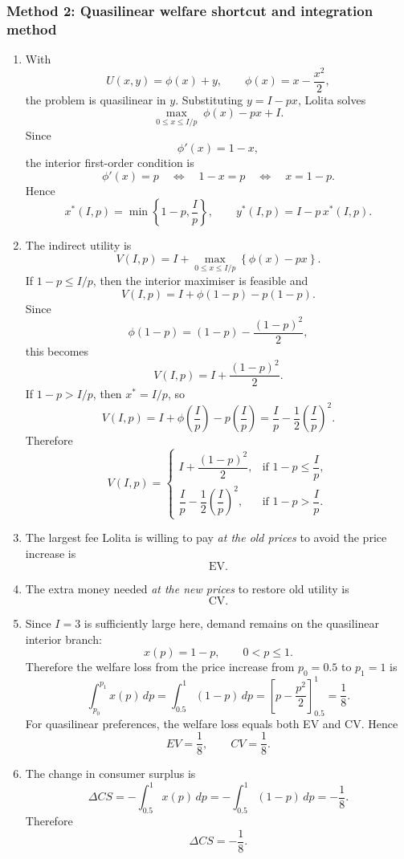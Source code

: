 \documentclass[12pt]{article}
\begin{document}
\newpage
\subsubsection{Method 2: Quasilinear welfare shortcut and integration method}
\begin{enumerate}[label=(\alph*)]
    \item
    With
    \[
    U(x,y)=\phi(x)+y,
    \qquad
    \phi(x)=x-\frac{x^2}{2},
    \]
    the problem is quasilinear in \(y\). Substituting \(y=I-px\), Lolita solves
    \[
    \max_{0\le x\le I/p}\;\phi(x)-px+I.
    \]
    Since
    \[
    \phi'(x)=1-x,
    \]
    the interior first-order condition is
    \[
    \phi'(x)=p
    \quad\Longleftrightarrow\quad
    1-x=p
    \quad\Longleftrightarrow\quad
    x=1-p.
    \]
    Hence
    \[
    \boxed{
    x^*(I,p)=\min\left\{1-p,\frac{I}{p}\right\},
    \qquad
    y^*(I,p)=I-p\,x^*(I,p).
    }
    \]

    \item
    The indirect utility is
    \[
    V(I,p)=I+\max_{0\le x\le I/p}\left\{\phi(x)-px\right\}.
    \]
    If \(1-p\le I/p\), then the interior maximiser is feasible and
    \[
    V(I,p)=I+\phi(1-p)-p(1-p).
    \]
    Since
    \[
    \phi(1-p)=(1-p)-\frac{(1-p)^2}{2},
    \]
    this becomes
    \[
    V(I,p)=I+\frac{(1-p)^2}{2}.
    \]
    If \(1-p>I/p\), then \(x^*=I/p\), so
    \[
    V(I,p)=I+\phi\!\left(\frac{I}{p}\right)-p\left(\frac{I}{p}\right)
    =\frac{I}{p}-\frac12\left(\frac{I}{p}\right)^2.
    \]
    Therefore
    \[
    \boxed{
    V(I,p)=
    \begin{cases}
    I+\dfrac{(1-p)^2}{2}, & \text{if } 1-p\le \dfrac{I}{p},\\[1.2ex]
    \dfrac{I}{p}-\dfrac12\left(\dfrac{I}{p}\right)^2, & \text{if } 1-p>\dfrac{I}{p}.
    \end{cases}}
    \]

\newpage
    \item
    The largest fee Lolita is willing to pay \emph{at the old prices} to avoid the price increase is
    \[
    \boxed{\text{EV}.}
    \]

    \item
    The extra money needed \emph{at the new prices} to restore old utility is
    \[
    \boxed{\text{CV}.}
    \]

    \item
    Since \(I=3\) is sufficiently large here, demand remains on the quasilinear interior branch:
    \[
    x(p)=1-p,\qquad 0<p\le 1.
    \]
    Therefore the welfare loss from the price increase from \(p_0=0.5\) to \(p_1=1\) is
    \[
    \int_{p_0}^{p_1} x(p)\,dp
    =
    \int_{0.5}^{1}(1-p)\,dp
    =
    \left[p-\frac{p^2}{2}\right]_{0.5}^{1}
    =
    \frac18.
    \]
    For quasilinear preferences, the welfare loss equals both EV and CV. Hence
    \[
    \boxed{EV=\frac18,\qquad CV=\frac18.}
    \]

    \item
    The change in consumer surplus is
    \[
    \Delta CS
    =
    -\int_{0.5}^{1}x(p)\,dp
    =
    -\int_{0.5}^{1}(1-p)\,dp
    =
    -\frac18.
    \]
    Therefore
    \[
    \boxed{\Delta CS=-\frac18.}
    \]
\end{enumerate}
\end{document}
